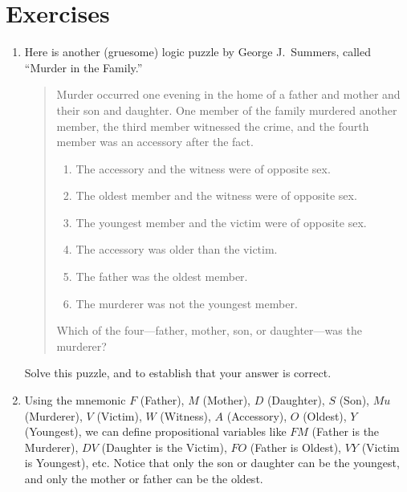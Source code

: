 \documentclass[letterpaper,10pt,english]{sphinxmanual}
\begin{document}
\section{Exercises}
\label{\detokenize{propositional_logic:exercises}}\begin{enumerate}
%
\item {} 
\sphinxAtStartPar
Here is another (gruesome) logic puzzle by George J. Summers, called “Murder in the Family.”
\begin{quote}

\sphinxAtStartPar
Murder occurred one evening in the home of a father and mother and their son and daughter. One member of the family murdered another member, the third member witnessed the crime, and the fourth member was an accessory after the fact.
\begin{enumerate}
%
\item {} 
\sphinxAtStartPar
The accessory and the witness were of opposite sex.

\item {} 
\sphinxAtStartPar
The oldest member and the witness were of opposite sex.

\item {} 
\sphinxAtStartPar
The youngest member and the victim were of opposite sex.

\item {} 
\sphinxAtStartPar
The accessory was older than the victim.

\item {} 
\sphinxAtStartPar
The father was the oldest member.

\item {} 
\sphinxAtStartPar
The murderer was not the youngest member.

\end{enumerate}

\sphinxAtStartPar
Which of the four—father, mother, son, or daughter—was the murderer?
\end{quote}

\sphinxAtStartPar
Solve this puzzle, and  to establish that your answer is correct.

\item {} 
\sphinxAtStartPar
Using the mnemonic \(F\) (Father), \(M\) (Mother), \(D\) (Daughter), \(S\) (Son), \(\mathord{Mu}\) (Murderer), \(V\) (Victim), \(W\) (Witness), \(A\) (Accessory), \(O\) (Oldest), \(Y\) (Youngest), we can define propositional variables like \(FM\) (Father is the Murderer), \(DV\) (Daughter is the Victim), \(FO\) (Father is Oldest), \(VY\) (Victim is Youngest), etc. Notice that only the son or daughter can be the youngest, and only the mother or father can be the oldest.


\end{enumerate}
\end{document}
